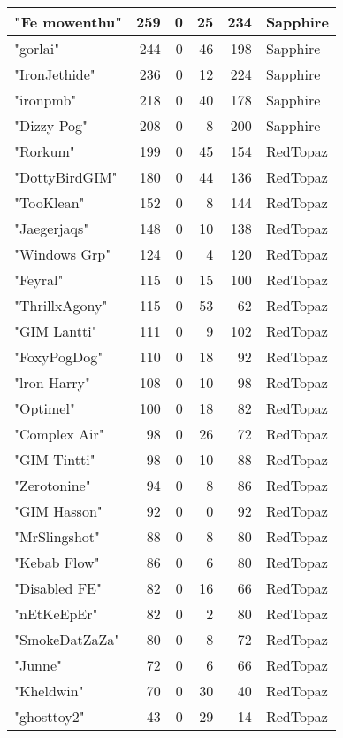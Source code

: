 \documentclass{article}
\begin{document}
\begin{table}[htbp]
\begin{tabular}{|l|r|r|r|r|l|}
"Fe mowenthu" & 259 & 0 & 25 & 234 & Sapphire \\ \hline
"gorlai" & 244 & 0 & 46 & 198 & Sapphire \\ \hline
"IronJethide" & 236 & 0 & 12 & 224 & Sapphire \\ \hline
"ironpmb" & 218 & 0 & 40 & 178 & Sapphire \\ \hline
"Dizzy Pog" & 208 & 0 & 8 & 200 & Sapphire \\ \hline
"Rorkum" & 199 & 0 & 45 & 154 & RedTopaz \\ \hline
"DottyBirdGIM" & 180 & 0 & 44 & 136 & RedTopaz \\ \hline
"TooKlean" & 152 & 0 & 8 & 144 & RedTopaz \\ \hline
"Jaegerjaqs" & 148 & 0 & 10 & 138 & RedTopaz \\ \hline
"Windows Grp" & 124 & 0 & 4 & 120 & RedTopaz \\ \hline
"Feyral" & 115 & 0 & 15 & 100 & RedTopaz \\ \hline
"ThrillxAgony" & 115 & 0 & 53 & 62 & RedTopaz \\ \hline
"GIM Lantti" & 111 & 0 & 9 & 102 & RedTopaz \\ \hline
"FoxyPogDog" & 110 & 0 & 18 & 92 & RedTopaz \\ \hline
"lron Harry" & 108 & 0 & 10 & 98 & RedTopaz \\ \hline
"Optimel" & 100 & 0 & 18 & 82 & RedTopaz \\ \hline
"Complex Air" & 98 & 0 & 26 & 72 & RedTopaz \\ \hline
"GIM Tintti" & 98 & 0 & 10 & 88 & RedTopaz \\ \hline
"Zerotonine" & 94 & 0 & 8 & 86 & RedTopaz \\ \hline
"GIM Hasson" & 92 & 0 & 0 & 92 & RedTopaz \\ \hline
"MrSlingshot" & 88 & 0 & 8 & 80 & RedTopaz \\ \hline
"Kebab Flow" & 86 & 0 & 6 & 80 & RedTopaz \\ \hline
"Disabled FE" & 82 & 0 & 16 & 66 & RedTopaz \\ \hline
"nEtKeEpEr" & 82 & 0 & 2 & 80 & RedTopaz \\ \hline
"SmokeDatZaZa" & 80 & 0 & 8 & 72 & RedTopaz \\ \hline
"Junne" & 72 & 0 & 6 & 66 & RedTopaz \\ \hline
"Kheldwin" & 70 & 0 & 30 & 40 & RedTopaz \\ \hline
"ghosttoy2" & 43 & 0 & 29 & 14 & RedTopaz \\ \hline

\end{tabular}
\end{table}
\end{document}
